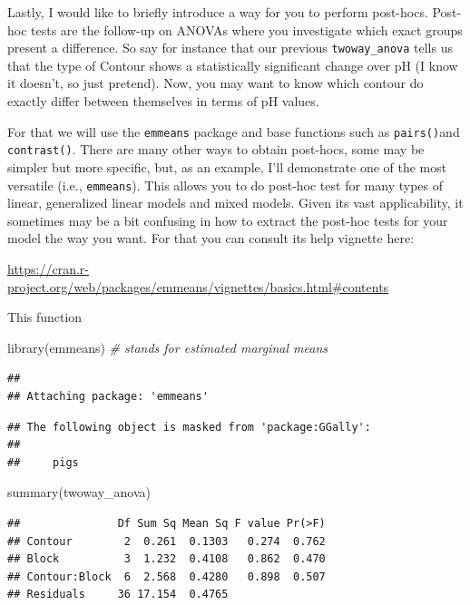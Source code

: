\documentclass[
]{book}
\newenvironment{Shaded}{\begin{snugshade}}{\end{snugshade}}
\newcommand{\CommentTok}[1]{\textcolor[rgb]{0.56,0.35,0.01}{\textit{#1}}}
\newcommand{\FunctionTok}[1]{\textcolor[rgb]{0.00,0.00,0.00}{#1}}
\newcommand{\NormalTok}[1]{#1}
\begin{document}
Lastly, I would like to briefly introduce a way for you to perform post-hocs. Post-hoc tests are the follow-up on ANOVAs where you investigate which exact groups present a difference. So say for instance that our previous \texttt{twoway\_anova} tells us that the type of Contour shows a statistically significant change over pH (I know it doesn't, so just pretend). Now, you may want to know which contour do exactly differ between themselves in terms of pH values.

For that we will use the \texttt{emmeans} package and base functions such as \texttt{pairs()}and \texttt{contrast()}. There are many other ways to obtain post-hocs, some may be simpler but more specific, but, as an example, I'll demonstrate one of the most versatile (i.e., \texttt{emmeans}). This allows you to do post-hoc test for many types of linear, generalized linear models and mixed models. Given its vast applicability, it sometimes may be a bit confusing in how to extract the post-hoc tests for your model the way you want. For that you can consult its help vignette here:

\url{https://cran.r-project.org/web/packages/emmeans/vignettes/basics.html\#contents}

This function

\begin{Shaded}
\begin{Highlighting}[]
\FunctionTok{library}\NormalTok{(emmeans)  }\CommentTok{\# stands for estimated marginal means}
\end{Highlighting}
\end{Shaded}

\begin{verbatim}
## 
## Attaching package: 'emmeans'
\end{verbatim}

\begin{verbatim}
## The following object is masked from 'package:GGally':
## 
##     pigs
\end{verbatim}

\begin{Shaded}
\begin{Highlighting}[]
\FunctionTok{summary}\NormalTok{(twoway\_anova)}
\end{Highlighting}
\end{Shaded}

\begin{verbatim}
##               Df Sum Sq Mean Sq F value Pr(>F)
## Contour        2  0.261  0.1303   0.274  0.762
## Block          3  1.232  0.4108   0.862  0.470
## Contour:Block  6  2.568  0.4280   0.898  0.507
## Residuals     36 17.154  0.4765
\end{verbatim}
\end{document}
